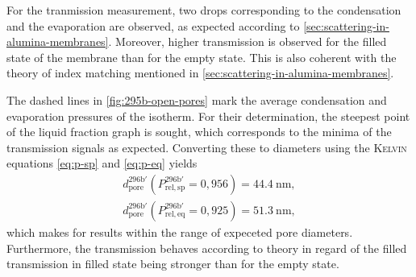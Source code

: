 \documentclass[../thesis.tex]{subfiles}
\begin{document}
        For the tranmission measurement, two drops corresponding to the condensation and the evaporation are observed, as expected according to \cref{sec:scattering-in-alumina-membranes}. Moreover, higher transmission is observed for the filled state of the membrane than for the empty state. This is also coherent with the theory of index matching mentioned in \cref{sec:scattering-in-alumina-membranes}.
        \medskip

        The dashed lines in \cref{fig:295b-open-pores} mark the average condensation and evaporation pressures of the isotherm. For their determination, the steepest point of the liquid fraction graph is sought, which corresponds to the minima of the transmission signals as expected. Converting these to diameters using the \textsc{Kelvin} equations \cref{eq:p-sp} and \cref{eq:p-eq} yields
        \begin{align*}
          d_\mathrm{pore}^\mathrm{296b'}(P_\mathrm{rel,sp}^\mathrm{296b'}=0,956)=\SI{44,4}{\nano\meter}, \\
          d_\mathrm{pore}^\mathrm{296b'}(P_\mathrm{rel,eq}^\mathrm{296b'}=0,925)=\SI{51,3}{\nano\meter},
        \end{align*}
        which makes for results within the range of expeceted pore diameters. Furthermore, the transmission behaves according to theory in regard of the filled transmission in filled state being stronger than for the empty state.
        \medskip

        
\end{document}

